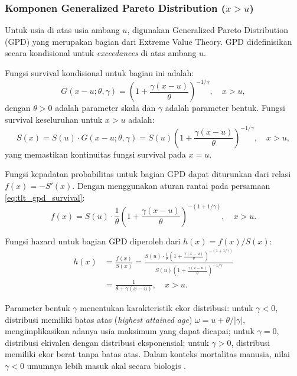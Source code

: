 \subsubsection{Komponen Generalized Pareto Distribution ($x > u$)}

Untuk usia di atas usia ambang $u$, digunakan Generalized Pareto Distribution (GPD) yang merupakan bagian dari Extreme Value Theory. GPD didefinisikan secara kondisional untuk \textit{exceedances} di atas ambang $u$.

Fungsi survival kondisional untuk bagian ini adalah:
\begin{equation}
G(x-u; \theta, \gamma) = \left(1 + \frac{\gamma(x-u)}{\theta}\right)^{-1/\gamma}, \quad x > u,
\label{eq:gpd_survival_conditional}
\end{equation}
dengan $\theta > 0$ adalah parameter skala dan $\gamma$ adalah parameter bentuk. Fungsi survival keseluruhan untuk $x > u$ adalah:
\begin{equation}
S(x) = S(u) \cdot G(x-u; \theta, \gamma) = S(u) \left(1 + \frac{\gamma(x-u)}{\theta}\right)^{-1/\gamma}, \quad x > u,
\label{eq:tlt_gpd_survival}
\end{equation}
yang memastikan kontinuitas fungsi survival pada $x = u$.

Fungsi kepadatan probabilitas untuk bagian GPD dapat diturunkan dari relasi $f(x) = -S'(x)$. Dengan menggunakan aturan rantai pada persamaan \eqref{eq:tlt_gpd_survival}:
\begin{equation}
f(x) = S(u) \cdot \frac{1}{\theta}\left(1 + \frac{\gamma(x-u)}{\theta}\right)^{-(1+1/\gamma)}, \quad x > u.
\label{eq:tlt_gpd_pdf}
\end{equation}

Fungsi hazard untuk bagian GPD diperoleh dari $h(x) = f(x)/S(x)$:
\begin{align}
h(x) &= \frac{f(x)}{S(x)} = \frac{S(u) \cdot \frac{1}{\theta}\left(1 + \frac{\gamma(x-u)}{\theta}\right)^{-(1+1/\gamma)}}{S(u) \left(1 + \frac{\gamma(x-u)}{\theta}\right)^{-1/\gamma}} \nonumber \\
&= \frac{1}{\theta + \gamma(x-u)}, \quad x > u.
\label{eq:tlt_gpd_hazard}
\end{align}

Parameter bentuk $\gamma$ menentukan karakteristik ekor distribusi: untuk $\gamma < 0$, distribusi memiliki batas atas (\textit{highest attained age}) $\omega = u + \theta/|\gamma|$, mengimplikasikan adanya usia maksimum yang dapat dicapai; untuk $\gamma = 0$, distribusi ekivalen dengan distribusi eksponensial; untuk $\gamma > 0$, distribusi memiliki ekor berat tanpa batas atas. Dalam konteks mortalitas manusia, nilai $\gamma < 0$ umumnya lebih masuk akal secara biologis \citep{dong2016evidence}.

